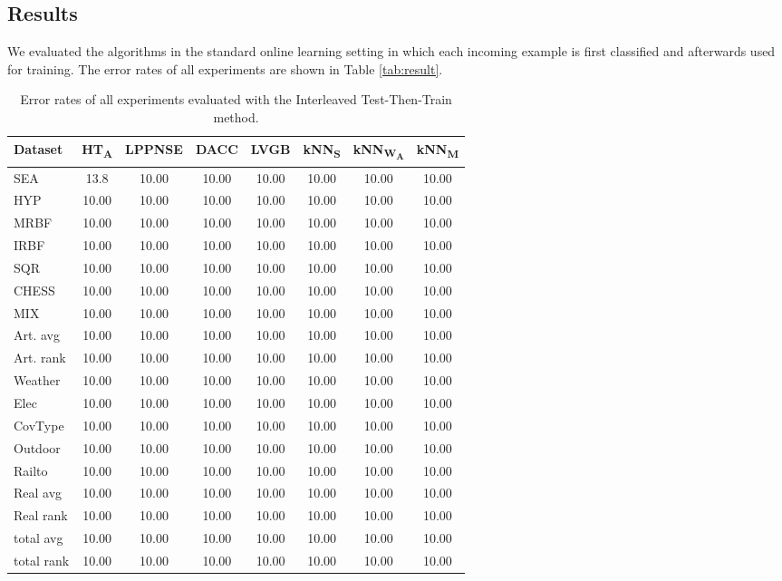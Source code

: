 \documentclass[conference]{IEEEtran}
\begin{document}
\subsection{Results}
We evaluated the algorithms in the standard online learning setting in which each incoming example is first classified and afterwards used for training. The error rates of all experiments are shown
in Table \ref{tab:result}.\\
\begin{table*}
\def\arraystretch{0.9}
\footnotesize
\centering
\caption{Error rates of all experiments evaluated with the Interleaved Test-Then-Train method.}
\label{tab:result}
\begin{tabular}{l|ccccccc}
Dataset & HT\textsubscript{A} & LPPNSE &DACC& LVGB & kNN\textsubscript{S} & kNN\textsubscript{W\textsubscript{A}}& kNN\textsubscript{M}\\\hline
SEA & 13.8 & 10.00 & 10.00 & 10.00 & 10.00 & 10.00 & 10.00\\
HYP & 10.00 & 10.00 & 10.00 & 10.00 & 10.00 & 10.00 & 10.00\\ 
MRBF & 10.00 & 10.00 & 10.00 & 10.00 & 10.00 & 10.00 & 10.00\\
IRBF & 10.00 & 10.00 & 10.00 & 10.00 & 10.00 & 10.00 & 10.00\\
SQR & 10.00 & 10.00 & 10.00 & 10.00 & 10.00 & 10.00 & 10.00\\
CHESS & 10.00 & 10.00 & 10.00 & 10.00 & 10.00 & 10.00 & 10.00\\
MIX & 10.00 & 10.00 & 10.00 & 10.00 & 10.00 & 10.00 & 10.00\\\hline
Art. avg & 10.00 & 10.00 & 10.00 & 10.00 & 10.00 & 10.00 & 10.00\\\hline
Art. rank & 10.00 & 10.00 & 10.00 & 10.00 & 10.00 & 10.00 & 10.00\\\hline
Weather & 10.00 & 10.00 & 10.00 & 10.00 & 10.00 & 10.00 & 10.00\\
Elec & 10.00 & 10.00 & 10.00 & 10.00 & 10.00 & 10.00 & 10.00\\
CovType & 10.00 & 10.00 & 10.00 & 10.00 & 10.00 & 10.00 & 10.00\\
Outdoor & 10.00 & 10.00 & 10.00 & 10.00 & 10.00 & 10.00 & 10.00\\
Railto & 10.00 & 10.00 & 10.00 & 10.00 & 10.00 & 10.00 & 10.00\\\hline
Real avg& 10.00 & 10.00 & 10.00 & 10.00 & 10.00 & 10.00 & 10.00\\\hline
Real rank& 10.00 & 10.00 & 10.00 & 10.00 & 10.00 & 10.00 & 10.00\\\hline
total avg& 10.00 & 10.00 & 10.00 & 10.00 & 10.00 & 10.00 & 10.00\\\hline
total rank& 10.00 & 10.00 & 10.00 & 10.00 & 10.00 & 10.00 & 10.00\\\hline
\end{tabular}
\label{tab:datasets}
\end{table*}
\end{document}
